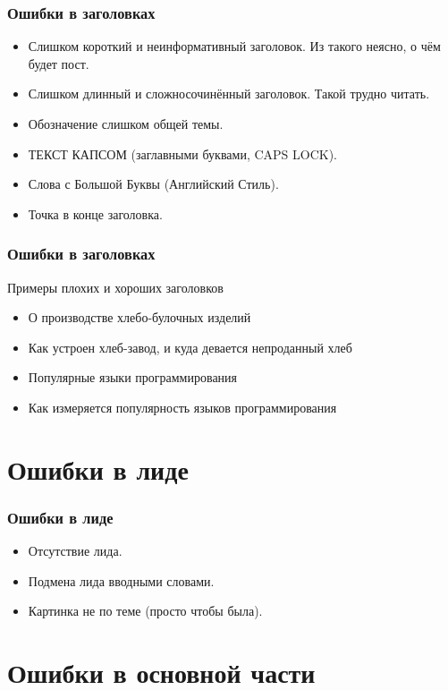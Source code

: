 \documentclass[12pt]{beamer}
\begin{document}
\begin{frame}
  \frametitle{Ошибки в заголовках}
  \begin{itemize}
  \item Слишком короткий и неинформативный заголовок. Из такого неясно,
    о чём будет пост.
  \item Слишком длинный и сложносочинённый заголовок. Такой трудно читать.
  \item Обозначение слишком общей темы.
  \item ТЕКСТ КАПСОМ (заглавными буквами, CAPS LOCK).
  \item Слова с Большой Буквы (Английский Стиль).
  \item Точка в конце заголовка.
  \end{itemize}
\end{frame}

\begin{frame}
  \frametitle{Ошибки в заголовках}
  Примеры плохих и хороших заголовков
  \begin{itemize}
  \item О производстве хлебо-булочных изделий
  \item Как устроен хлеб-завод, и куда девается непроданный хлеб
  \end{itemize}
  \begin{itemize}
  \item Популярные языки программирования
  \item Как измеряется популярность языков программирования
  \end{itemize}
\end{frame}

\section{Ошибки в лиде}

\begin{frame}
  \frametitle{Ошибки в лиде}
  \begin{itemize}
  \item Отсутствие лида.
  \item Подмена лида вводными словами.
  \item Картинка не по теме (просто чтобы была).
\end{itemize}
\end{frame}

\section{Ошибки в основной части}
\end{document}
